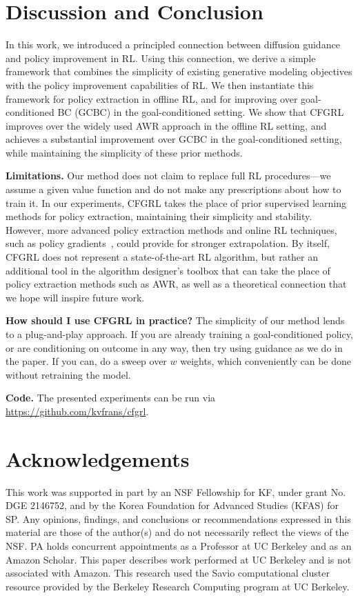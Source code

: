 \documentclass{article}
\begin{document}
\section{Discussion and Conclusion}

In this work, we introduced a principled connection between diffusion guidance and policy improvement in RL. Using this connection, we derive a simple framework that combines the simplicity of existing generative modeling objectives with the policy improvement capabilities of RL. We then instantiate this framework for policy extraction in offline RL, and for improving over goal-conditioned BC (GCBC) in the goal-conditioned setting. We show that CFGRL improves over the widely used AWR approach in the offline RL setting, and achieves a substantial improvement over GCBC in the goal-conditioned setting, while maintaining the simplicity of these prior methods.

\textbf{Limitations.} Our method does not claim to replace full RL procedures---we assume a given value function and do not make any prescriptions about how to train it. In our experiments, CFGRL takes the place of prior supervised learning methods for policy extraction, maintaining their simplicity and stability. However, more advanced policy extraction methods and online RL techniques, such as policy gradients~\citep{ddpg_lillicrap2016, ppo_schulman2017}, could provide for stronger extrapolation. By itself, CFGRL does not represent a state-of-the-art RL algorithm, but rather an additional tool in the algorithm designer's toolbox that can take the place of policy extraction methods such as AWR, as well as a theoretical connection that we hope will inspire future work.

\textbf{How should I use CFGRL in practice?} The simplicity of our method lends to a plug-and-play approach. If you are already training a goal-conditioned policy, or are conditioning on outcome in any way, then try using guidance as we do in the paper. If you can, do a sweep over $w$ weights, which conveniently can be done without retraining the model.

\textbf{Code.} The presented experiments can be run via \url{https://github.com/kvfrans/cfgrl}.

\section{Acknowledgements}
This work was supported in part by an NSF Fellowship for KF, under grant No. DGE 2146752, and by the Korea Foundation for Advanced Studies (KFAS) for SP. Any opinions, findings, and conclusions or recommendations expressed in this material are those of the author(s) and do not necessarily reflect the views of the NSF. PA holds concurrent appointments as a Professor at UC Berkeley and as an Amazon Scholar. This paper describes work performed at UC Berkeley and is not associated with Amazon. This research used the Savio computational cluster resource provided by the Berkeley Research Computing program at UC Berkeley.
\end{document}
